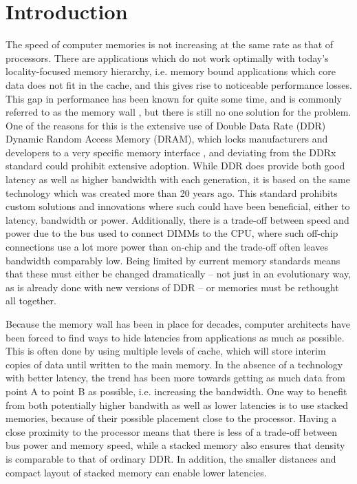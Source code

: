 \chapter{Introduction} \label{intro}
The speed of computer memories is not increasing at the same rate as that of processors. There are applications which do not work optimally with today's locality-focused memory hierarchy, i.e. memory bound applications which core data does not fit in the cache, and this gives rise to noticeable performance losses. This gap in performance has been known for quite some time, and is commonly referred to as the memory wall \cite{wulf1995hitting}, but there is still no one solution for the problem. One of the reasons for this is the extensive use of Double Data Rate (DDR) Dynamic Random Access Memory (DRAM), which locks manufacturers and developers to a very specific memory interface \cite{standard2008double}, and deviating from the DDRx standard could prohibit extensive adoption. While DDR does provide both good latency as well as higher bandwidth with each generation, it is based on the same technology which was created more than 20 years ago. This standard prohibits custom solutions and innovations where such could have been beneficial, either to latency, bandwidth or power. Additionally, there is a trade-off between speed and power due to the bus used to connect DIMMs to the CPU, where such off-chip connections use a lot more power than on-chip and the trade-off often leaves bandwidth comparably low. Being limited by current memory standards means that these must either be changed dramatically -- not just in an evolutionary way, as is already done with new versions of DDR -- or memories must be rethought all together.
\bigskip

Because the memory wall has been in place for decades, computer architects have been forced to find ways to hide latencies from applications as much as possible. This is often done by using multiple levels of cache, which will store interim copies of data until written to the main memory. In the absence of a technology with better latency, the trend has been more towards getting as much data from point A to point B as possible, i.e. increasing the bandwidth. One way to benefit from both potentially higher bandwith as well as lower latencies is to use stacked memories, because of their possible placement close to the processor. Having a close proximity to the processor means that there is less of a trade-off between bus power and memory speed, while a stacked memory also ensures that density is comparable to that of ordinary DDR. In addition, the smaller distances and compact layout of stacked memory can enable lower latencies.
\bigskip

